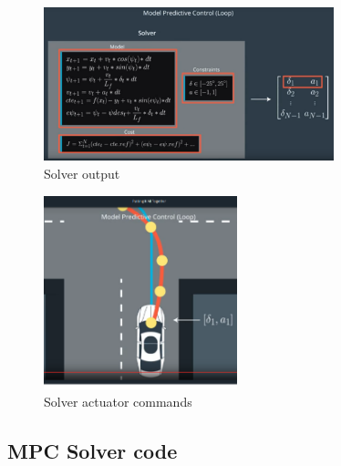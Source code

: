 \documentclass[11pt]{article}
\begin{document}
\begin{figure}[h]
    \centering
    \includegraphics[width=0.75\textwidth]{solver_out}
    \caption{Solver output}
    \label{fig:solver_out}
\end{figure}

\begin{figure}[h]
    \centering
    \includegraphics[width=0.5\textwidth]{solver_actuate}
    \caption{Solver actuator commands}
    \label{fig:solver_actuate}
\end{figure}

\FloatBarrier

\subsection{MPC Solver code}
\end{document}

